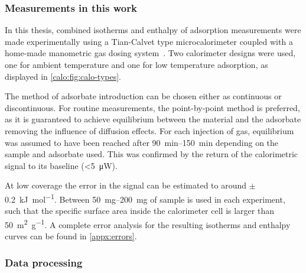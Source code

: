 \subsubsection{Measurements in this work}

In this thesis, combined isotherms and enthalpy of adsorption
measurements were made experimentally using a Tian-Calvet type
microcalorimeter coupled with a home-made manometric gas dosing
system~\cite{llewellynGasAdsorptionMicrocalorimetry2005}.
Two calorimeter designs were used, one for ambient temperature
and one for low temperature adsorption, as displayed in
\autoref{calo:fig:calo-types}.

The method of adsorbate introduction can be chosen either as
continuous or discontinuous. For routine measurements,
the point-by-point method is preferred, as it is guaranteed
to achieve equilibrium between the material and the adsorbate
removing the influence of diffusion effects.
For each injection of gas, equilibrium was assumed to have
been reached after \SIrange{90}{150}{\minute} depending on the
sample and adsorbate used. This was confirmed by the return
of the calorimetric signal to its baseline (<\SI{5}{\micro\watt}).

At low coverage the error in the signal can be estimated to around
\( \pm \) \SI{0.2} {\kilo\joule\per\mol}.
Between \SIrange{50}{200}{\milli\gram}
of sample is used in each experiment, such that the specific
surface area inside the calorimeter cell is larger than
\SI{50}{\metre^2\per\gram}. A complete error
analysis for the resulting isotherms and enthalpy curves
can be found in \autoref{appx:errors}.

\subsubsection{Data processing}